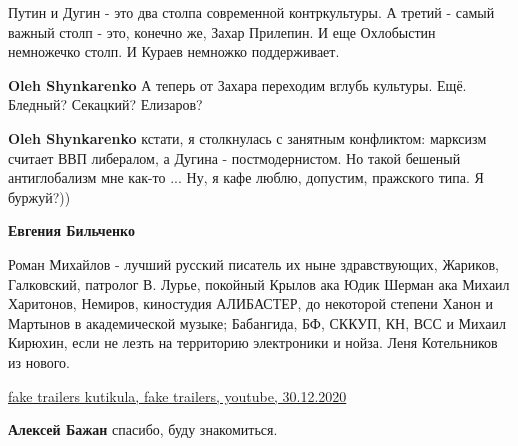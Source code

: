 \begin{itemize}
Путин и Дугин - это два столпа современной контркультуры. А третий - самый
важный столп - это, конечно же, Захар Прилепин. И еще Охлобыстин немножечко
столп. И Кураев немножко поддерживает.

\begin{itemize}
 
\textbf{Oleh Shynkarenko} А теперь от Захара переходим вглубь культуры. Ещё. Бледный? Секацкий? Елизаров?

 
\textbf{Oleh Shynkarenko} кстати, я столкнулась с занятным конфликтом: марксизм считает ВВП либералом, а Дугина - постмодернистом. Но такой бешеный антиглобализм мне как-то ... Ну, я кафе люблю, допустим, пражского типа. Я буржуй?))

 
\textbf{Евгения Бильченко} 

Роман Михайлов - лучший русский писатель их ныне здравствующих, Жариков,
Галковский, патролог В. Лурье, покойный Крылов ака Юдик Шерман ака Михаил
Харитонов, Немиров, киностудия АЛИБАСТЕР, до некоторой степени Ханон и Мартынов
в академической музыке; Бабангида, БФ, СККУП, КН, ВСС и Михаил Кирюхин, если не
лезть на территорию электроники и нойза. Леня Котельников из нового. 

\href{https://www.youtube.com/watch?v=ppASJKc3o6E}{%
fake trailers kutikula, fake trailers, youtube, 30.12.2020%
}

 
\textbf{Алексей Бажан} спасибо, буду знакомиться.


\end{itemize}
\end{itemize}
